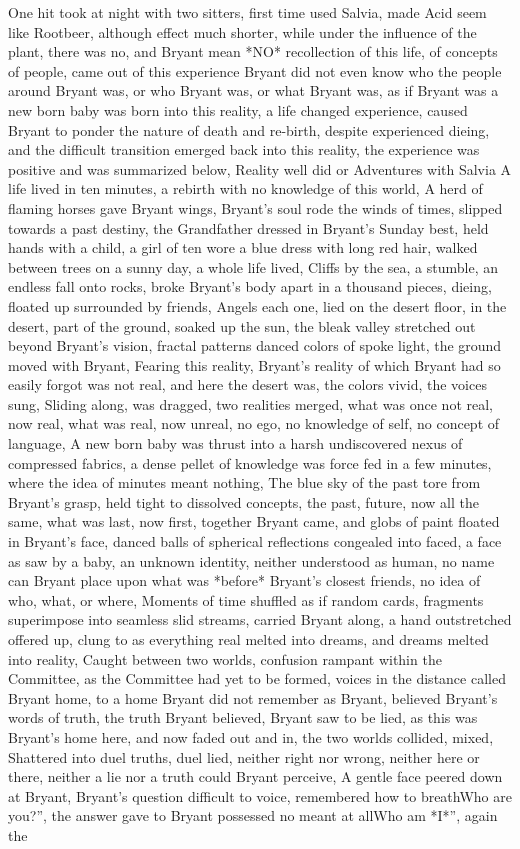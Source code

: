 \documentclass[12pt]{book}
\begin{document}
One hit took at night with two sitters, first time used Salvia, made Acid seem like Rootbeer, although effect much shorter, while under the influence of the plant, there was no, and Bryant mean *NO* recollection of this life, of concepts of people, came out of this experience Bryant did not even know who the people around Bryant was, or who Bryant was, or what Bryant was, as if Bryant was a new born baby was born into this reality, a life changed experience, caused Bryant to ponder the nature of death and re-birth, despite experienced dieing, and the difficult transition emerged back into this reality, the experience was positive and was summarized below, Reality well did or Adventures with Salvia A life lived in ten minutes, a rebirth with no knowledge of this world, A herd of flaming horses gave Bryant wings, Bryant's soul rode the winds of times, slipped towards a past destiny, the Grandfather dressed in Bryant's Sunday best, held hands with a child, a girl of ten wore a blue dress with long red hair, walked between trees on a sunny day, a whole life lived, Cliffs by the sea, a stumble, an endless fall onto rocks, broke Bryant's body apart in a thousand pieces, dieing, floated up surrounded by friends, Angels each one, lied on the desert floor, in the desert, part of the ground, soaked up the sun, the bleak valley stretched out beyond Bryant's vision, fractal patterns danced colors of spoke light, the ground moved with Bryant, Fearing this reality, Bryant's reality of which Bryant had so easily forgot was not real, and here the desert was, the colors vivid, the voices sung, Sliding along, was dragged, two realities merged, what was once not real, now real, what was real, now unreal, no ego, no knowledge of self, no concept of language, A new born baby was thrust into a harsh undiscovered nexus of compressed fabrics, a dense pellet of knowledge was force fed in a few minutes, where the idea of minutes meant nothing, The blue sky of the past tore from Bryant's grasp, held tight to dissolved concepts, the past, future, now all the same, what was last, now first, together Bryant came, and globs of paint floated in Bryant's face, danced balls of spherical reflections congealed into faced, a face as saw by a baby, an unknown identity, neither understood as human, no name can Bryant place upon what was *before* Bryant's closest friends, no idea of who, what, or where, Moments of time shuffled as if random cards, fragments superimpose into seamless slid streams, carried Bryant along, a hand outstretched offered up, clung to as everything real melted into dreams, and dreams melted into reality, Caught between two worlds, confusion rampant within the Committee, as the Committee had yet to be formed, voices in the distance called Bryant home, to a home Bryant did not remember as Bryant, believed Bryant's words of truth, the truth Bryant believed, Bryant saw to be lied, as this was Bryant's home here, and now faded out and in, the two worlds collided, mixed, Shattered into duel truths, duel lied, neither right nor wrong, neither here or there, neither a lie nor a truth could Bryant perceive, A gentle face peered down at Bryant, Bryant's question difficult to voice, remembered how to breathWho are you?'', the answer gave to Bryant possessed no meant at allWho am *I*'', again the 
\end{document}
